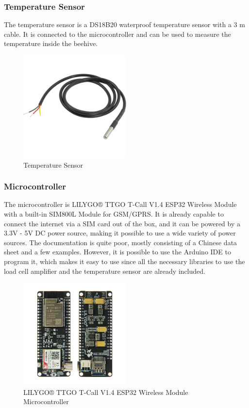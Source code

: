 \newpage
\subsubsection{Temperature Sensor}
The temperature sensor is a DS18B20 waterproof temperature sensor with a 3 m cable. It is connected to the microcontroller and can be used to measure the temperature inside the beehive.

\begin{figure}
    \centering
    \includegraphics[width=0.5\textwidth]{figures/DS18B20.png}
    \caption{Temperature Sensor}
    \label{fig:temperature_sensor}
\end{figure}
\newpage
\subsubsection{Microcontroller}
The microcontroller is LILYGO® TTGO T-Call V1.4 ESP32 Wireless Module with a built-in SIM800L Module for GSM/GPRS. It is already capable to connect the internet via a SIM card out of the box, and it can be powered by a 3.3V - 5V DC power source, making it possible to use a wide variety of power sources. The documentation is quite poor, mostly consisting of a Chinese data sheet and a few examples. However, it is possible to use the Arduino IDE to program it, which makes it easy to use since all the necessary libraries to use the load cell amplifier and the temperature sensor are already included.

\begin{figure}
    \centering
    \includegraphics[width=0.5\textwidth]{figures/esp32.jpg}
    \caption{LILYGO® TTGO T-Call V1.4 ESP32 Wireless Module Microcontroller}
    \label{fig:esp32}
\end{figure}

